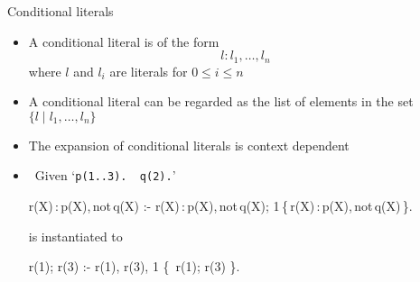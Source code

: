 \begin{frame}[fragile]{Conditional literals}
  \begin{itemize}
  \item {} A \alert{conditional literal} is of the form
    \[
     l:l_1,\dots, l_n
    \]
    where $l$ and $l_i$ are literals for $0\leq i\leq n$
  \item {}
    A conditional literal can be regarded as the list of elements in the
    set $\{ l\mid l_1,\dots, l_n\}$
  \item<2->  The expansion of conditional literals is context dependent
  \item<3->  \
  Given `\;\verb+p(1..3).  q(2).+'

  \smallskip%
  \parbox{\linewidth}{\footnotesize%
  \begin{semiverbatim}
  \alert<4,5>{r(X)\,:\,p(X)\!,\,not\,q(X)} :- \alert<4,6>{r(X)\,:\,p(X)\!,\,not\,q(X)}; 1\,\{\,\alert<4,7>{r(X)\,:\,p(X)\!,\,not\,q(X)}\,\}.
  \end{semiverbatim}}

  \smallskip
  is instantiated to

  \medskip%
  \parbox{\linewidth}{\footnotesize%
  \begin{semiverbatim}
  \alert<5>{r(1); r(3)} :- \alert<6>{r(1), r(3)}, 1 \{~\alert<7>{r(1); r(3)} \}.
  \end{semiverbatim}}
  \end{itemize}
\end{frame}
